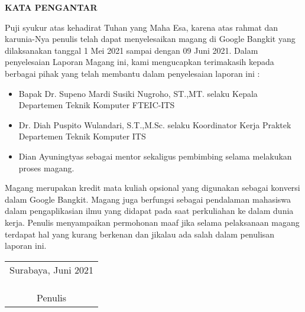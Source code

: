\begin{center}
  \Large\textbf{KATA PENGANTAR}
\end{center}
\vspace{2ex}


Puji syukur atas kehadirat Tuhan yang Maha Esa, karena atas rahmat dan karunia-Nya penulis telah dapat menyelesaikan magang di Google Bangkit yang dilaksanakan tanggal 1 Mei 2021 sampai dengan 09 Juni 2021. Dalam penyelesaian Laporan Magang ini, kami mengucapkan terimakasih kepada berbagai pihak yang telah membantu dalam penyelesaian laporan ini :

\begin{itemize}
  \item Bapak Dr. Supeno Mardi Susiki Nugroho, ST.,MT. selaku Kepala Departemen Teknik Komputer FTEIC-ITS
  \item Dr. Diah Puspito Wulandari, S.T.,M.Sc. selaku Koordinator Kerja Praktek Departemen Teknik Komputer ITS
  \item Dian Ayuningtyas sebagai mentor sekaligus pembimbing selama melakukan proses magang.
\end{itemize}

Magang merupakan kredit mata kuliah opsional yang digunakan sebagai konversi dalam Google Bangkit. Magang juga berfungsi sebagai pendalaman mahasiswa dalam pengaplikasian ilmu yang didapat pada saat perkuliahan ke dalam dunia kerja. Penulis menyampaikan permohonan maaf jika selama pelaksanaan magang terdapat hal yang kurang berkenan dan jikalau ada salah dalam penulisan laporan ini.

\begin{flushright}
  \begin{tabular}[b]{c}
    Surabaya, Juni 2021
    \\
    \\
    \\
    \\
    Penulis
  \end{tabular}
\end{flushright}

